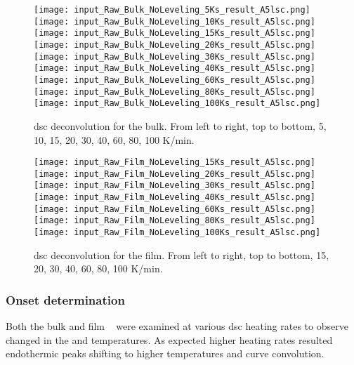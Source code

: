 \documentclass[draft,a4paper,12pt,oneside]{article}%
\begin{document}
\begin{figure}[b]
	\centering
	\texttt{[image: input\_Raw\_Bulk\_NoLeveling\_5Ks\_result\_A5lsc.png]}\quad
	\texttt{[image: input\_Raw\_Bulk\_NoLeveling\_10Ks\_result\_A5lsc.png]}\quad
	\texttt{[image: input\_Raw\_Bulk\_NoLeveling\_15Ks\_result\_A5lsc.png]}
	\medskip
	\texttt{[image: input\_Raw\_Bulk\_NoLeveling\_20Ks\_result\_A5lsc.png]}\quad
	\texttt{[image: input\_Raw\_Bulk\_NoLeveling\_30Ks\_result\_A5lsc.png]}\quad
	\texttt{[image: input\_Raw\_Bulk\_NoLeveling\_40Ks\_result\_A5lsc.png]}
	\medskip
	\texttt{[image: input\_Raw\_Bulk\_NoLeveling\_60Ks\_result\_A5lsc.png]}\quad
	\texttt{[image: input\_Raw\_Bulk\_NoLeveling\_80Ks\_result\_A5lsc.png]}\quad
	\texttt{[image: input\_Raw\_Bulk\_NoLeveling\_100Ks\_result\_A5lsc.png]}
	\caption{\acrshort{dsc} deconvolution for the bulk. From left to right, top to bottom, 5, 10, 15, 20, 30, 40, 60, 80, 100 K/min.}
	\label{fig:DSC_Bulk_Decon}
\end{figure}

\begin{figure}[b]
	\centering
	\texttt{[image: input\_Raw\_Film\_NoLeveling\_15Ks\_result\_A5lsc.png]}\quad
	\texttt{[image: input\_Raw\_Film\_NoLeveling\_20Ks\_result\_A5lsc.png]}\quad
	\texttt{[image: input\_Raw\_Film\_NoLeveling\_30Ks\_result\_A5lsc.png]}
	\medskip
	\texttt{[image: input\_Raw\_Film\_NoLeveling\_40Ks\_result\_A5lsc.png]}\quad
	\texttt{[image: input\_Raw\_Film\_NoLeveling\_60Ks\_result\_A5lsc.png]}\quad
	\texttt{[image: input\_Raw\_Film\_NoLeveling\_80Ks\_result\_A5lsc.png]}
	\medskip
	\texttt{[image: input\_Raw\_Film\_NoLeveling\_100Ks\_result\_A5lsc.png]}
	\caption{\acrshort{dsc} deconvolution for the film. From left to right, top to bottom, 15, 20, 30, 40, 60, 80, 100 K/min.}
	\label{fig:DSC_Film_Decon}
\end{figure}

\subsubsection{Onset determination}

Both the bulk and film \MgZnCa~ were examined at various \acrshort{dsc} heating rates to observe changed in the \Tg and \Tx temperatures. As expected higher heating rates resulted endothermic peaks shifting to higher temperatures and curve convolution. 
\end{document}
